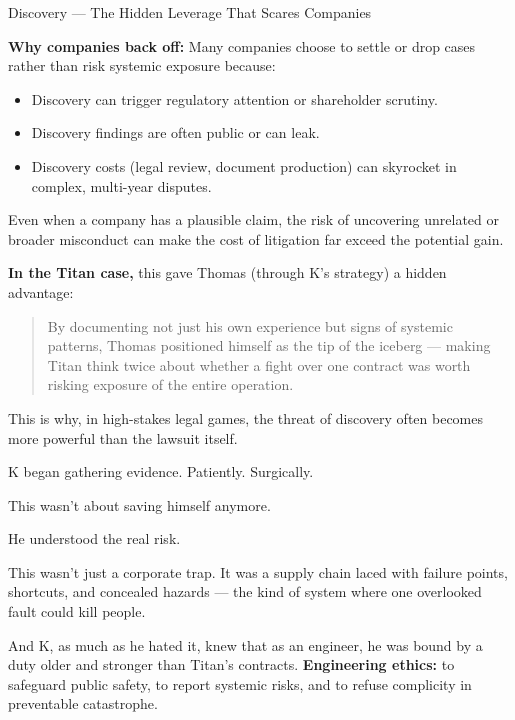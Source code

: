 \begin{HistoricalSidebar}{Discovery --- The Hidden Leverage That Scares Companies}
    \medskip
    
    \textbf{Why companies back off:} Many companies choose to settle or drop cases rather than risk systemic exposure because:

    \medskip

    \begin{itemize}
        \item Discovery can trigger regulatory attention or shareholder scrutiny.
        \item Discovery findings are often public or can leak.
        \item Discovery costs (legal review, document production) can skyrocket in complex, multi-year disputes.
    \end{itemize}

    \medskip
    
    Even when a company has a plausible claim, the risk of uncovering unrelated or broader misconduct can make the cost of litigation far exceed the potential gain.
    
    \medskip
    
    \textbf{In the Titan case,} this gave Thomas (through K’s strategy) a hidden advantage:

    \medskip

    \begin{quote}
        By documenting not just his own experience but signs of systemic patterns,  
        Thomas positioned himself as the tip of the iceberg —  
        making Titan think twice about whether a fight over one contract was worth risking exposure of the entire operation.
    \end{quote}
    
    This is why, in high-stakes legal games, the threat of discovery often becomes more powerful than the lawsuit itself.
    
\end{HistoricalSidebar}

\medskip

K began gathering evidence.
Patiently.
Surgically.

This wasn’t about saving himself anymore.

He understood the real risk.

This wasn’t just a corporate trap.
It was a supply chain laced with failure points, shortcuts, and concealed hazards —
the kind of system where one overlooked fault could kill people.

And K, as much as he hated it, knew that as an engineer, he was bound by a duty older and stronger than Titan’s contracts.
\textbf{Engineering ethics:} to safeguard public safety, to report systemic risks, and to refuse complicity in preventable catastrophe.

